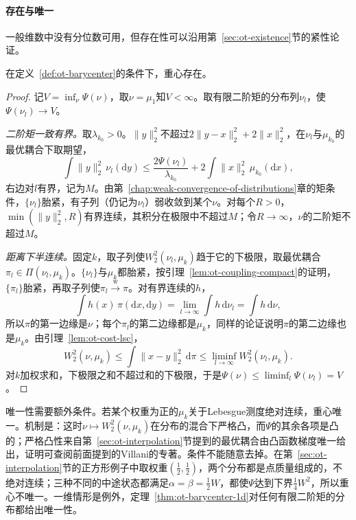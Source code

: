 \paragraph{存在与唯一}
一般维数中没有分位数可用，但存在性可以沿用第~\ref{sec:ot-existence}节的紧性论证。

\begin{theorem}[重心的存在]
\label{thm:ot-barycenter-existence}
在定义~\ref{def:ot-barycenter}的条件下，重心存在。
\end{theorem}

\begin{proof}
记$V=\inf_\nu\Psi(\nu)$，取$\nu=\mu_1$知$V<\infty$。取有限二阶矩的分布列$\nu_l$，使$\Psi(\nu_l)\to V$。

\emph{二阶矩一致有界。}取$\lambda_{k_0}>0$。$\lVert y\rVert_2^{2}$不超过$2\lVert y-x\rVert_2^{2}+2\lVert x\rVert_2^{2}$，在$\nu_l$与$\mu_{k_0}$的最优耦合下取期望，
\[
 \int\lVert y\rVert_2^{2}\,\nu_l(\mathrm{d}y)\leq\frac{2\Psi(\nu_l)}{\lambda_{k_0}}+2\int\lVert x\rVert_2^{2}\,\mu_{k_0}(\mathrm{d}x),
\]
右边对$l$有界，记为$M$。由第~\ref{chap:weak-convergence-of-distributions}章的矩条件，$\{\nu_l\}$胎紧，有子列（仍记为$\nu_l$）弱收敛到某个$\nu$。对每个$R>0$，$\min(\lVert y\rVert_2^{2},R)$有界连续，其积分在极限中不超过$M$；令$R\to\infty$，$\nu$的二阶矩不超过$M$。

\emph{距离下半连续。}固定$k$，取子列使$W_2^{2}(\nu_l,\mu_k)$趋于它的下极限，取最优耦合$\pi_l\in\Pi(\nu_l,\mu_k)$。$\{\nu_l\}$与$\mu_k$都胎紧，按引理~\ref{lem:ot-coupling-compact}的证明，$\{\pi_l\}$胎紧，再取子列使$\pi_l\xrightarrow{\mathrm{w}}\pi$。对有界连续的$h$，
\[
 \int h(x)\,\pi(\mathrm{d}x,\mathrm{d}y)=\lim_{l\to\infty}\int h\,\mathrm{d}\nu_l=\int h\,\mathrm{d}\nu ,
\]
所以$\pi$的第一边缘是$\nu$；每个$\pi_l$的第二边缘都是$\mu_k$，同样的论证说明$\pi$的第二边缘也是$\mu_k$。由引理~\ref{lem:ot-cost-lsc}，
\[
 W_2^{2}(\nu,\mu_k)\leq\int\lVert x-y\rVert_2^{2}\,\mathrm{d}\pi\leq\liminf_{l\to\infty}W_2^{2}(\nu_l,\mu_k).
\]
对$k$加权求和，下极限之和不超过和的下极限，于是$\Psi(\nu)\leq\liminf_l\Psi(\nu_l)=V$。
\end{proof}

唯一性需要额外条件。若某个权重为正的$\mu_k$关于Lebesgue测度绝对连续，重心唯一。机制是：这时$\nu\mapsto W_2^{2}(\nu,\mu_k)$在分布的混合下严格凸，而$\Psi$的其余各项是凸的；严格凸性来自第~\ref{sec:ot-interpolation}节提到的最优耦合由凸函数梯度唯一给出，证明可查阅前面提到的Villani的专著。条件不能随意去掉。在第~\ref{sec:ot-interpolation}节的正方形例子中取权重$(\tfrac12,\tfrac12)$，两个分布都是点质量组成的，不绝对连续；三种不同的中途状态都满足$\alpha=\beta=\tfrac12W$，都使$\Psi$达到下界$\tfrac14W^{2}$，所以重心不唯一。一维情形是例外，定理~\ref{thm:ot-barycenter-1d}对任何有限二阶矩的分布都给出唯一性。
